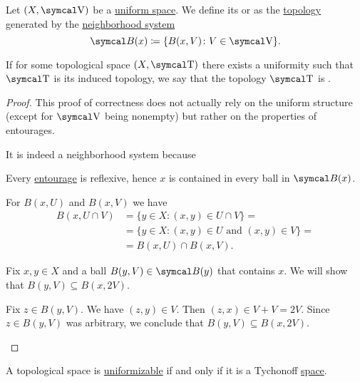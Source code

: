 \begin{definition}\label{def:uniform_topology}
  Let \( (X, \CV) \) be a \hyperref[def:uniform_space]{uniform space}. We define its  or  as the \hyperref[def:topological_space]{topology} generated by the \hyperref[def:topological_local_base]{neighborhood system}
  \begin{equation*}
    \Cal{B}(x) \coloneqq \{ B(x, V) \colon V \in \CV \}.
  \end{equation*}

  If for some topological space \( (X, \CT) \) there exists a uniformity such that \( \CT \) is its induced topology, we say that the topology \( \CT \) is .
\end{definition}
\begin{proof}
  This proof of correctness does not actually rely on the uniform structure (except for \( \CV \) being nonempty) but rather on the properties of entourages.

  It is indeed a neighborhood system because
  \begin{RefList}
     Every \hyperref[def:entourage]{entourage} is reflexive, hence \( x \) is contained in every ball in \( \Cal{B}(x) \).

     For \( B(x, U) \) and \( B(x, V) \) we have
    \begin{align*}
      B(x, U \cap V)
       & =
      \{ y \in X \colon (x, y) \in U \cap V \}
      =    \\ &=
      \{ y \in X \colon (x, y) \in U \text{ and } (x, y) \in V \}
      =    \\ &=
      B(x, U) \cap B(x, V).
    \end{align*}

     Fix \( x, y \in X \) and a ball \( B(y, V) \in \Cal{B}(y) \) that contains \( x \). We will show that \( B(y, V) \subseteq B(x, 2V) \).

    Fix \( z \in B(y, V) \). We have \( (z, y) \in V \). Then \( (z, x) \in V + V = 2V \). Since \( z \in B(y, V) \) was arbitrary, we conclude that \( B(y, V) \subseteq B(x, 2V) \).
  \end{RefList}
\end{proof}

\begin{theorem}\label{thm:tychonoff_spaces_are_uniformizable}
  A topological space is \hyperref[def:uniform_topology]{uniformizable} if and only if it is a Tychonoff \hyperref[def:separation_axioms/T3.5]{space}.
\end{theorem}

